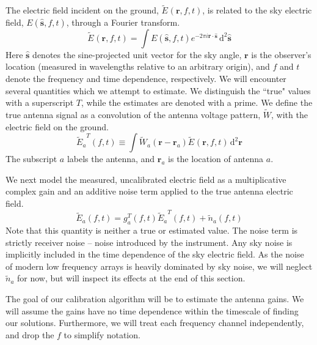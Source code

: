 \documentclass[a4paper,fleqn,usenatbib]{../mnras}
\newcommand{\ra}{\ensuremath{\mathbf{r}_a}}
\newcommand{\beamr}{\ensuremath{\widetilde{W}}}
\newcommand{\Er}[1]{\ensuremath{\widetilde{E}_{#1}}}
\newcommand{\dif}{\mathrm{d}}
\begin{document}
The electric field incident on the ground, $\Er{}(\mathbf{r},f,t)$, is related to the sky electric field, $E(\hat{\mathbf{s}},f,t)$, through a Fourier transform.
\begin{equation}
\Er{}(\mathbf{r},f,t) = \int E(\hat{\mathbf{s}},f,t) e^{-2\pi i \mathbf{r}\cdot \hat{\mathbf{s}}}\, \dif^2 \hat{\mathbf{s}}
\end{equation}
Here $\hat{\mathbf{s}}$ denotes the sine-projected unit vector for the sky angle, $\mathbf{r}$ is the observer's location (measured in wavelengths relative to an arbitrary origin), and $f$ and $t$ denote the frequency and time dependence, respectively. We will encounter several quantities which we attempt to estimate. We distinguish the ``true" values with a superscript $T$, while the estimates are denoted with a prime. We define the true antenna signal as a convolution of the antenna voltage pattern, $\beamr$, with the electric field on the ground.
\begin{equation}
\Er{a}^T(f,t) \equiv \int \beamr_a(\mathbf{r}-\ra) \Er{}(\mathbf{r},f,t) \, \dif^2 \mathbf{r}
\end{equation}
The subscript $a$ labels the antenna, and $\mathbf{r}_a$ is the location of antenna $a$.

We next model the measured, uncalibrated electric field as a multiplicative complex gain and an additive noise term applied to the true antenna electric field. 
\begin{equation}\label{eq:apply_gain}
\Er{a}(f,t) = g^T_a(f,t) \Er{a}^T(f,t) + \widetilde{n}_a(f,t)
\end{equation}
Note that this quantity is neither a true or estimated value. The noise term is strictly receiver noise -- noise introduced by the instrument. Any sky noise is implicitly included in the time dependence of the sky electric field. As the noise of modern low frequency arrays is heavily dominated by sky noise, we will neglect $\widetilde{n}_a$ for now, but will inspect its effects at the end of this section.

The goal of our calibration algorithm will be to estimate the antenna gains. We will assume the gains have no time dependence within the timescale of finding our solutions. Furthermore, we will treat each frequency channel independently, and drop the $f$ to simplify notation.
\end{document}
